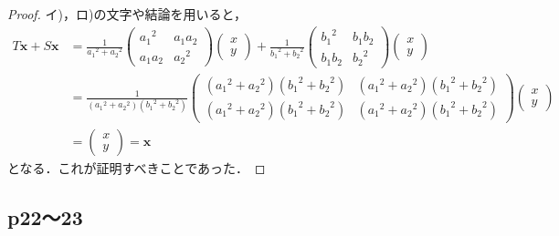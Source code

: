 \documentclass[dvipdfmx,uplatex,11pt]{jsarticle}
\theoremstyle{definition}
\begin{document}
\begin{leftbar}
    \begin{proof}
    イ)，ロ)の文字や結論を用いると，
        \begin{align*}
        T \bm{x} + S \bm{x} & =
        \frac{1}{{a_1}^2+{a_2}^2}
        \begin{pmatrix}
            {a_1}^2 & a_1 a_2 \\
            a_1 a_2 & {a_2}^2
        \end{pmatrix}
        \begin{pmatrix}
            x \\
            y
        \end{pmatrix}
        +
        \frac{1}{{b_1}^2+{b_2}^2}
        \begin{pmatrix}
            {b_1}^2 & b_1 b_2 \\
            b_1 b_2 & {b_2}^2
        \end{pmatrix}
        \begin{pmatrix}
            x \\
            y
        \end{pmatrix}
        \\
        & = \frac{1}{({a_1}^2+{a_2}^2)({b_1}^2+{b_2}^2)}
        \begin{pmatrix}
            ({a_1}^2+{a_2}^2)({b_1}^2+{b_2}^2) & ({a_1}^2+{a_2}^2)({b_1}^2+{b_2}^2) \\
            ({a_1}^2+{a_2}^2)({b_1}^2+{b_2}^2) & ({a_1}^2+{a_2}^2)({b_1}^2+{b_2}^2)
        \end{pmatrix}
        \begin{pmatrix}
            x \\
            y
        \end{pmatrix}
        \\
        & =\begin{pmatrix}
            x \\
            y
        \end{pmatrix}
        =\bm{x}
    \end{align*}
    となる．これが証明すべきことであった．
\end{proof}
\end{leftbar}
%
\subsection{p22〜23}
%
%
%
\newpage
%
%
%
\setcounter{equation}{0}
\end{document}

